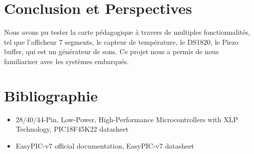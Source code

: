 \documentclass[a4paper, 12pt]{book}
\begin{document}
\chapter{Conclusion et Perspectives\label{chap-conclusion}}
Nous avons pu tester la carte pédagogique à travers de multiples fonctionnalités, tel que l'afficheur 7 segments, le capteur de température, le DS1820, le Piezo buffer, qui est un générateur de sons. 
Ce projet nous a permis de nous familiariser avec les systèmes embarqués.

\chapter{Bibliographie}
\begin{itemize}
\item 28/40/44-Pin, Low-Power, High-Performance Microcontrollers with XLP Technology, PIC18F45K22 datasheet
\item EasyPIC-v7 official documentation, EasyPIC-v7 datasheet
\end{itemize}



\end{document}
